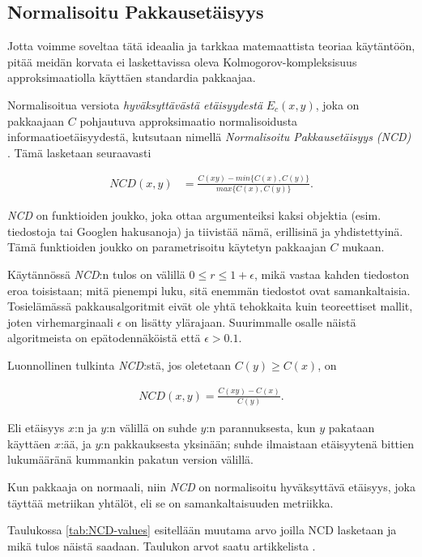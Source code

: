 \documentclass[12pt,finnish]{tktltiki2}
\theoremstyle{definition}
\theoremstyle{remark}
\begin{document}
\subsection{Normalisoitu Pakkausetäisyys} %
\label{sub:normalisoitu_pakkausetaisyys}

  Jotta voimme soveltaa tätä ideaalia ja tarkkaa matemaattista teoriaa käytäntöön, pitää meidän korvata ei laskettavissa oleva Kolmogorov-kompleksisuus approksimaatiolla käyttäen standardia pakkaajaa.

  Normalisoitua versiota \emph{hyväksyttävästä etäisyydestä} $E_c(x,y)$, joka on pakkaajaan $C$ pohjautuva approksimaatio normalisoidusta informaatioetäisyydestä, kutsutaan nimellä \emph{Normalisoitu Pakkausetäisyys (NCD)} \cite{CV05}.
  Tämä lasketaan seuraavasti

  \begin{align}
    NCD(x,y) &= \frac{C(xy)-min\{C(x),C(y)\}}{max\{C(x),C(y)\}}.
  \end{align}

  \emph{NCD} on funktioiden joukko, joka ottaa argumenteiksi kaksi objektia (esim. tiedostoja tai Googlen hakusanoja) ja tiivistää nämä, erillisinä ja yhdistettyinä.
  Tämä funktioiden joukko on parametrisoitu käytetyn pakkaajan $C$ mukaan.

  Käytännössä \emph{NCD}:n tulos on välillä $0 \leq r \leq 1+ \epsilon$, mikä vastaa kahden tiedoston eroa toisistaan; mitä pienempi luku, sitä enemmän tiedostot ovat samankaltaisia.
  Tosielämässä pakkausalgoritmit eivät ole yhtä tehokkaita kuin teoreettiset mallit, joten virhemarginaali $\epsilon$ on lisätty ylärajaan.
  Suurimmalle osalle näistä algoritmeista on epätodennäköistä että  $\epsilon > 0.1$.

  Luonnollinen tulkinta \emph{NCD}:stä, jos oletetaan $C(y) \geq C(x)$, on

  \begin{align}
    NCD(x,y) = \frac{C(xy)-C(x)}{C(y)}.
  \end{align}

  Eli etäisyys $x$:n ja $y$:n välillä on suhde $y$:n parannuksesta, kun $y$ pakataan käyttäen $x$:ää, ja $y$:n pakkauksesta yksinään; suhde ilmaistaan etäisyytenä bittien lukumääränä kummankin pakatun version välillä.

  Kun pakkaaja on normaali, niin \emph{NCD} on normalisoitu hyväksyttävä etäisyys, joka täyttää metriikan yhtälöt, eli se on samankaltaisuuden metriikka.

  Taulukossa \ref{tab:NCD-values} esitellään muutama arvo joilla NCD lasketaan ja mikä tulos näistä saadaan. Taulukon arvot saatu artikkelista \cite{cebrian2005common}.
\end{document}
